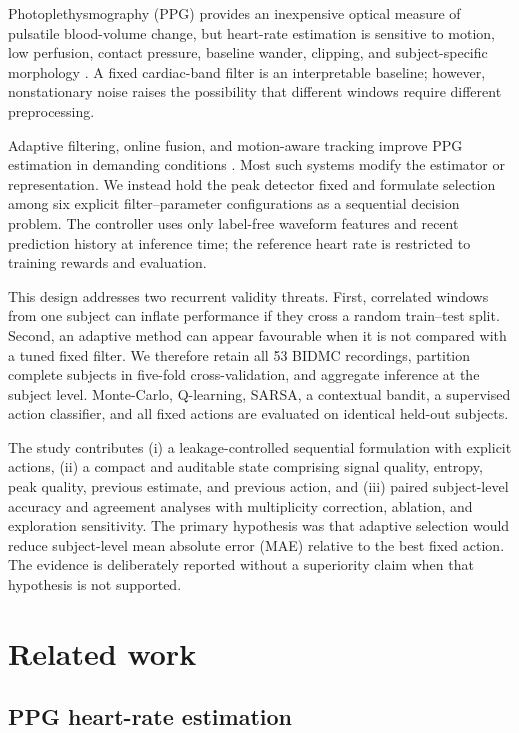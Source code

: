 \documentclass{elektr}
\begin{document}
Photoplethysmography (PPG) provides an inexpensive optical measure of pulsatile
blood-volume change, but heart-rate estimation is sensitive to motion, low
perfusion, contact pressure, baseline wander, clipping, and subject-specific
morphology \cite{charlton2023,kyriacou2026}. A fixed cardiac-band filter is an
interpretable baseline; however, nonstationary noise raises the possibility that
different windows require different preprocessing.

Adaptive filtering, online fusion, and motion-aware tracking improve PPG
estimation in demanding conditions \cite{wearablefusion2023,wrist2023,hao2024}.
Most such systems modify the estimator or representation. We instead hold the
peak detector fixed and formulate selection among six explicit filter--parameter
configurations as a sequential decision problem. The controller uses only
label-free waveform features and recent prediction history at inference time;
the reference heart rate is restricted to training rewards and evaluation.

This design addresses two recurrent validity threats. First, correlated windows
from one subject can inflate performance if they cross a random train--test
split. Second, an adaptive method can appear favourable when it is not compared
with a tuned fixed filter. We therefore retain all 53 BIDMC recordings, partition
complete subjects in five-fold cross-validation, and aggregate inference at the
subject level. Monte-Carlo, Q-learning, SARSA, a contextual bandit, a supervised
action classifier, and all fixed actions are evaluated on identical held-out
subjects.

The study contributes (i) a leakage-controlled sequential formulation with
explicit actions, (ii) a compact and auditable state comprising signal quality,
entropy, peak quality, previous estimate, and previous action, and (iii) paired
subject-level accuracy and agreement analyses with multiplicity correction,
ablation, and exploration sensitivity. The primary hypothesis was that adaptive
selection would reduce subject-level mean absolute error (MAE) relative to the
best fixed action. The evidence is deliberately reported without a superiority
claim when that hypothesis is not supported.

\section{Related work}

\subsection{PPG heart-rate estimation}
\end{document}
